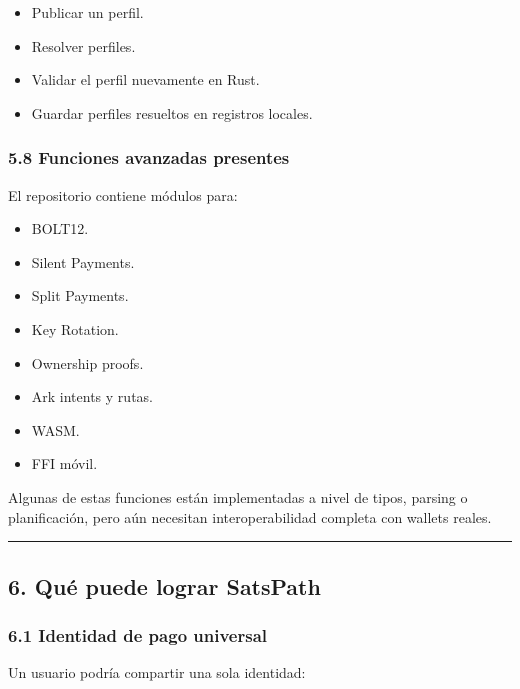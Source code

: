 \documentclass[
]{article}
\providecommand{\tightlist}{%
  \setlength{\itemsep}{0pt}\setlength{\parskip}{0pt}}
\begin{document}
\begin{itemize}
\tightlist
\item
  Publicar un perfil.
\item
  Resolver perfiles.
\item
  Validar el perfil nuevamente en Rust.
\item
  Guardar perfiles resueltos en registros locales.
\end{itemize}

\hypertarget{funciones-avanzadas-presentes}{%
\subsubsection{5.8 Funciones avanzadas
presentes}\label{funciones-avanzadas-presentes}}

El repositorio contiene módulos para:

\begin{itemize}
\tightlist
\item
  BOLT12.
\item
  Silent Payments.
\item
  Split Payments.
\item
  Key Rotation.
\item
  Ownership proofs.
\item
  Ark intents y rutas.
\item
  WASM.
\item
  FFI móvil.
\end{itemize}

Algunas de estas funciones están implementadas a nivel de tipos, parsing
o planificación, pero aún necesitan interoperabilidad completa con
wallets reales.

\begin{center}\rule{0.5\linewidth}{0.5pt}\end{center}

\hypertarget{quuxe9-puede-lograr-satspath}{%
\subsection{6. Qué puede lograr
SatsPath}\label{quuxe9-puede-lograr-satspath}}

\hypertarget{identidad-de-pago-universal}{%
\subsubsection{6.1 Identidad de pago
universal}\label{identidad-de-pago-universal}}

Un usuario podría compartir una sola identidad:
\end{document}
